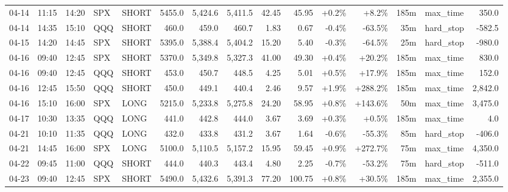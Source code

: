 \documentclass[11pt,a4paper,twoside]{article}
\begin{document}
\begin{landscape}
\begin{center}
\begin{longtable}{>{\color{txtmain}}l l l l l r r r r r r r r >{\color{txtmain}}l r}
04-14 & 11:15 & 14:20 & SPX & SHORT & 5455.0 & 5,424.6 & 5,411.5 & 42.45 & 45.95 & \textcolor{wingreen}{+0.2\%} & \textcolor{wingreen}{+8.2\%} & 185m & max\_time & \textcolor{wingreen}{350.0} \\
04-14 & 14:35 & 15:10 & QQQ & SHORT & 460.0 & 459.0 & 460.7 & 1.83 & 0.67 & \textcolor{lossred}{-0.4\%} & \textcolor{lossred}{-63.5\%} & 35m & hard\_stop & \textcolor{lossred}{-582.5} \\
04-15 & 14:20 & 14:45 & SPX & SHORT & 5395.0 & 5,388.4 & 5,404.2 & 15.20 & 5.40 & \textcolor{lossred}{-0.3\%} & \textcolor{lossred}{-64.5\%} & 25m & hard\_stop & \textcolor{lossred}{-980.0} \\
04-16 & 09:40 & 12:45 & SPX & SHORT & 5370.0 & 5,349.8 & 5,327.3 & 41.00 & 49.30 & \textcolor{wingreen}{+0.4\%} & \textcolor{wingreen}{+20.2\%} & 185m & max\_time & \textcolor{wingreen}{830.0} \\
04-16 & 09:40 & 12:45 & QQQ & SHORT & 453.0 & 450.7 & 448.5 & 4.25 & 5.01 & \textcolor{wingreen}{+0.5\%} & \textcolor{wingreen}{+17.9\%} & 185m & max\_time & \textcolor{wingreen}{152.0} \\
04-16 & 12:45 & 15:50 & QQQ & SHORT & 450.0 & 449.1 & 440.4 & 2.46 & 9.57 & \textcolor{wingreen}{+1.9\%} & \textcolor{wingreen}{+288.2\%} & 185m & max\_time & \textcolor{wingreen}{2,842.0} \\
04-16 & 15:10 & 16:00 & SPX & LONG & 5215.0 & 5,233.8 & 5,275.8 & 24.20 & 58.95 & \textcolor{wingreen}{+0.8\%} & \textcolor{wingreen}{+143.6\%} & 50m & max\_time & \textcolor{wingreen}{3,475.0} \\
04-17 & 10:30 & 13:35 & QQQ & LONG & 441.0 & 442.8 & 444.0 & 3.67 & 3.69 & \textcolor{wingreen}{+0.3\%} & \textcolor{wingreen}{+0.5\%} & 185m & max\_time & \textcolor{wingreen}{4.0} \\
04-21 & 10:10 & 11:35 & QQQ & LONG & 432.0 & 433.8 & 431.2 & 3.67 & 1.64 & \textcolor{lossred}{-0.6\%} & \textcolor{lossred}{-55.3\%} & 85m & hard\_stop & \textcolor{lossred}{-406.0} \\
04-21 & 14:45 & 16:00 & SPX & LONG & 5100.0 & 5,110.5 & 5,157.2 & 15.95 & 59.45 & \textcolor{wingreen}{+0.9\%} & \textcolor{wingreen}{+272.7\%} & 75m & max\_time & \textcolor{wingreen}{4,350.0} \\
04-22 & 09:45 & 11:00 & QQQ & SHORT & 444.0 & 440.3 & 443.4 & 4.80 & 2.25 & \textcolor{lossred}{-0.7\%} & \textcolor{lossred}{-53.2\%} & 75m & hard\_stop & \textcolor{lossred}{-511.0} \\
04-23 & 09:40 & 12:45 & SPX & SHORT & 5490.0 & 5,432.6 & 5,391.3 & 77.20 & 100.75 & \textcolor{wingreen}{+0.8\%} & \textcolor{wingreen}{+30.5\%} & 185m & max\_time & \textcolor{wingreen}{2,355.0} \\

\end{longtable}
\end{center}
\end{landscape}
\end{document}
